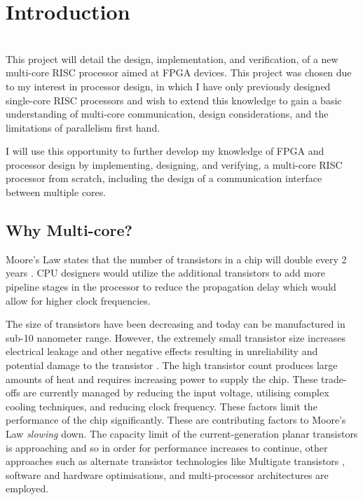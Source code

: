 \documentclass[11pt,a4paper]{report}
\begin{document}
\newpage
{}
\renewcommand*\contentsname{Table of Contents}
{%
\tableofcontents

\restoregeometry
\newpage
\chapter{Introduction}
{%
\startcontents[chapters]
}

\noindent\\
This project will detail the design, implementation, and verification, of a new multi-core RISC processor aimed at FPGA devices. This project was chosen due to my interest in processor design, in which I have only previously designed single-core RISC processors and wish to extend this knowledge to gain a basic understanding of multi-core communication, design considerations, and the limitations of parallelism first hand.

I will use this opportunity to further develop my knowledge of FPGA and processor design by implementing, designing, and verifying, a multi-core RISC processor from scratch, including the design of a communication interface between multiple cores.

\section{Why Multi-core?}

Moore's Law states that the number of transistors in a chip will double every 2 years \cite{}. CPU designers would utilize the  additional transistors to add more pipeline stages in the processor to reduce the propagation delay \cite{} which would allow for higher clock frequencies. 


The size of transistors have been decreasing \cite{} and today can be manufactured in sub-10 nanometer range. However, the extremely small transistor size increases electrical leakage and other negative effects resulting in unreliability and potential damage to the transistor \cite{}.  The high transistor count produces large amounts of heat and requires increasing power to supply the chip. These trade-offs are currently managed by reducing the input voltage, utilising complex cooling techniques, and reducing clock frequency. These factors limit the performance of the chip significantly.
These are contributing factors to Moore's Law \textit{slowing} down. 
The capacity limit of the current-generation planar transistors is approaching and so in order for performance increases to continue, other approaches such as alternate transistor technologies like Multigate transistors \cite{subramanian2010multiple}, software and hardware optimisations, and multi-processor architectures are employed.

}
\end{document}
